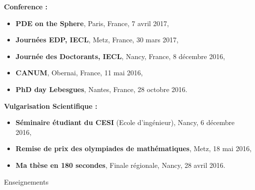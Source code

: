 \documentclass[10pt,a4paper]{report}
\begin{document}
\vspace{0.4cm}
\noindent
{\selectfont
\textbf{Conference :}
}

\begin{itemize}
\item \textbf{PDE on the Sphere}, Paris, France, 7 avril 2017,
\item \textbf{Journées EDP, IECL}, Metz, France, 30 mars 2017,
\item \textbf{Journée des Doctorants, IECL}, Nancy, France, 8 décembre 2016,
\item \textbf{CANUM}, Obernai, France, 11 mai 2016,
\item \textbf{PhD day Lebesgues}, Nantes, France, 28 octobre 2016.
\end{itemize}

\vspace{0.4cm}
\noindent
{\selectfont
\textbf{Vulgarisation Scientifique :}
}
\begin{itemize}
\item \textbf{Séminaire étudiant du CESI }(Ecole d'ingénieur), Nancy, 6 décembre 2016,
\item \textbf{Remise de prix des olympiades de mathématiques}, Metz, 18 mai 2016,
\item \textbf{Ma thèse en 180 secondes}, Finale régionale, Nancy, 28 avril 2016.
\end{itemize}

\vspace{1cm}
\noindent
{\selectfont
\begin{Large}
Enseignements
\end{Large}
\hrulefill
}
\end{document}
